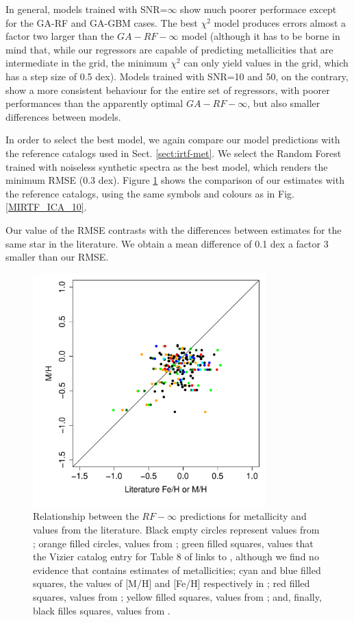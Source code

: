 In general, models trained with SNR=$\infty$ show much poorer 
performace except for the GA-RF and GA-GBM cases. The best $\chi^2$ 
model produces errors almost a factor two larger than the 
$GA-RF-\infty$ model (although it has to be borne in mind that, while 
our regressors are capable of predicting metallicities that are 
intermediate in the grid, the minimum $\chi^2$ can only yield values 
in the grid, which has a step size of 0.5 dex). Models trained with 
SNR=10 and 50, on the contrary,  show a more consistent behaviour for 
the entire set of regressors, with poorer performances than the 
apparently optimal $GA-RF-\infty$, but also smaller differences between models. 

In order to select the best model, we again compare our model
predictions with the reference catalogs used in
Sect. \ref{sect:irtf-met}. We select the Random Forest trained with
noiseless synthetic spectra as the best model, which renders the
minimum RMSE (0.3 dex). Figure \ref{fig:ipac_mt} shows the comparison
of our estimates with the reference catalogs, using the same symbols
and colours as in Fig. \ref{MIRTF_ICA_10}.

Our value of the RMSE contrasts with the differences between estimates
for the same star in the literature. We obtain a mean difference of
0.1 dex a factor 3 smaller than our RMSE. 

\begin{figure}
 \begin{center} \includegraphics[width=9cm]{figs/ipac-figs/M-RFInf.pdf}

\caption{Relationship
 between the $RF-\infty$ predictions for metallicity and values from
 the literature.  Black empty circles represent values
 from \protect\cite{cesetti} ; orange filled circles, values
 from \protect\cite{NevesIII}; green filled squares, values that the
 Vizier catalog entry for Table 8 of \protect\cite{NevesIII} links
 to \protect\cite{Jao}, although we find no evidence
 that \protect\cite{Jao} contains estimates of metallicities; cyan and
 blue filled squares, the values of [M/H] and [Fe/H] respectively
 in \protect\cite{RA2012}; red filled squares, values
 from \protect\cite{Mann2015}; yellow filled squares, values
 from \protect\cite{Newton2014}; and, finally, black filles squares,
 values
 from \protect\cite{Gaidos2015}.}  \label{fig:ipac_mt} \end{center}
\end{figure}



